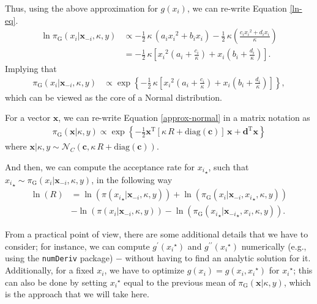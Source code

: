 \documentclass[12pt]{article}\usepackage[]{graphicx}\usepackage[]{color}
\begin{document}
Thus, using the above approximation for $g(x_i)$, we can re-write Equation \eqref{ln-eq}.
\begin{align*}
\ln \pi_{\text{G}}(x_i|\boldsymbol{x}_{-i}, \kappa, y) &\propto -\frac{1}{2}\, \kappa  \, (a_i {x_i}^2 + b_i x_i) -\frac{1}{2}\,\kappa\left(\frac{c_i {x_i}^2 + d_i x_i}{\kappa}\right) \\
                                            &= -\frac{1}{2}\,\kappa\left[{x_i}^2\left(a_i + \frac{c_i}{\kappa}\right) + x_i \left(b_i + \frac{d_i}{\kappa}\right) \right].
\end{align*}
Implying that
\begin{align}
\label{approx-normal}
\pi_{\text{G}}(x_i|\boldsymbol{x}_{-i}, \kappa, y) &\propto \exp\left\{-\frac{1}{2}\,\kappa\left[{x_i}^2\left(a_i + \frac{c_i}{\kappa}\right) + x_i \left(b_i + \frac{d_i}{\kappa}\right) \right]\right\},
\end{align}
which can be viewed as the core of a Normal distribution.

For a vector $\boldsymbol{x}$, we can re-write Equation \eqref{approx-normal} in a matrix notation as
\begin{align}
\label{matrix-notation-approx-normal}
\pi_{\text{G}}(\boldsymbol{x}|\kappa, y) \propto \exp\left\{-\frac{1}{2} \boldsymbol{x}^{\text{T}} \left[\kappa \, R + \text{diag}(\boldsymbol{c})\right]\,\boldsymbol{x} + \boldsymbol{d}^{\text{T}}\boldsymbol{x}\right\}
\end{align}
where $\boldsymbol{x}|\kappa, y \sim \mathcal{N}_C(\boldsymbol{c}, \kappa\,R + \text{diag}(\boldsymbol{c}))$.

And then, we can compute the acceptance rate for ${x_i}_{\star}$, such that ${x_i}_{\star} \sim \pi_{\text{G}}(x_i|\boldsymbol{x}_{-i}, \kappa, y)$, in the following way
\begin{align*}
\ln(R) &= \ln(\pi({x_i}_{\star} | \boldsymbol{x}_{-i}, \kappa, y)) +  \ln(\pi_{\text{G}}({x_i} | \boldsymbol{x}_{-i}, {x_i}_{\star}, \kappa, y)) \\
&- \ln(\pi({x_i} | \boldsymbol{x}_{-i}, \kappa, y)) - \ln(\pi_{\text{G}}({x_i}_{\star} | {\boldsymbol{x}_{-i}}_{\star}, x_i, \kappa, y)).
\end{align*}

From a practical point of view, there are some additional details that we have to consider; for instance, we can compute $g^{\prime}({x_i}^{\star})$ and $g^{\prime\prime}({x_i}^{\star})$ numerically (e.g., using the \texttt{numDeriv} package) $-$ without having to find an analytic solution for it. Additionally, for a fixed $x_i$, we have to optimize $g(x_i) = g(x_i, {x_i}^{\star})$ for ${x_i}^{\star}$; this can also be done by setting ${x_i}^{\star}$ equal to the previous mean of $\pi_{\text{G}}(\boldsymbol{x}|\kappa, y)$, which is the approach that we will take here.
\end{document}
